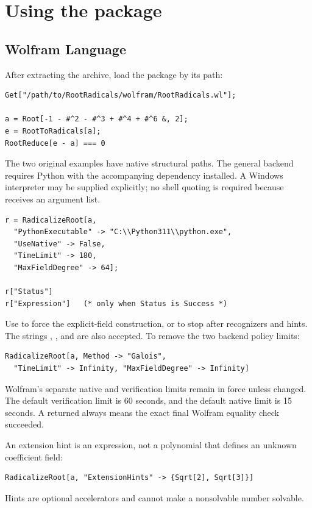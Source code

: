 \documentclass[11pt,letterpaper]{article}
\theoremstyle{definition}\newtheorem{definition}[theorem]{Definition}
\theoremstyle{remark}\newtheorem{remark}[theorem]{Remark}
\begin{document}
\section{Using the package}
\label{sec:usage}
\subsection{Wolfram Language}
After extracting the archive, load the package by its path:
\begin{lstlisting}
Get["/path/to/RootRadicals/wolfram/RootRadicals.wl"];

a = Root[-1 - #^2 - #^3 + #^4 + #^6 &, 2];
e = RootToRadicals[a];
RootReduce[e - a] === 0
\end{lstlisting}
The two original examples have native structural paths. The general backend
requires Python with the accompanying dependency installed. A Windows
interpreter may be supplied explicitly; no shell quoting is required because
 receives an argument list.
\begin{lstlisting}
r = RadicalizeRoot[a,
  "PythonExecutable" -> "C:\\Python311\\python.exe",
  "UseNative" -> False,
  "TimeLimit" -> 180,
  "MaxFieldDegree" -> 64];

r["Status"]
r["Expression"]   (* only when Status is Success *)
\end{lstlisting}
Use  to force the explicit-field construction, or
 to stop after recognizers and hints. The strings
, , and  are also accepted.
To remove the two backend policy limits:
\begin{lstlisting}
RadicalizeRoot[a, Method -> "Galois",
  "TimeLimit" -> Infinity, "MaxFieldDegree" -> Infinity]
\end{lstlisting}
Wolfram's separate native and verification limits remain in force unless
changed. The default verification limit is 60 seconds, and the default native
limit is 15 seconds. A returned  always means the exact final
Wolfram equality check succeeded.

An extension hint is an expression, not a polynomial that defines an unknown
coefficient field:
\begin{lstlisting}
RadicalizeRoot[a, "ExtensionHints" -> {Sqrt[2], Sqrt[3]}]
\end{lstlisting}
Hints are optional accelerators and cannot make a nonsolvable number solvable.
\end{document}

